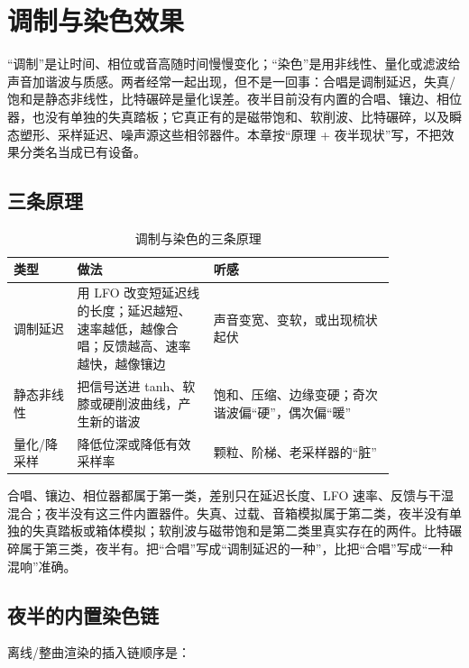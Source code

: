 \chapter{调制与染色效果}
\label{chap:modulation-coloration}


“调制”是让时间、相位或音高随时间慢慢变化；“染色”是用非线性、量化或滤波给声音加谐波与质感。两者经常一起出现，但不是一回事：合唱是调制延迟，失真/饱和是静态非线性，比特碾碎是量化误差。夜半目前没有内置的合唱、镶边、相位器，也没有单独的失真踏板；它真正有的是磁带饱和、软削波、比特碾碎，以及瞬态塑形、采样延迟、噪声源这些相邻器件。本章按“原理 + 夜半现状”写，不把效果分类名当成已有设备。

\section{三条原理}

\begin{table}[htbp]
\centering
\small
\begin{tabular}{@{}p{0.14\linewidth}p{0.30\linewidth}p{0.40\linewidth}@{}}
\hline
类型 & 做法 & 听感 \\
\hline
调制延迟 & 用 LFO 改变短延迟线的长度；延迟越短、速率越低，越像合唱；反馈越高、速率越快，越像镶边 & 声音变宽、变软，或出现梳状起伏 \\
静态非线性 & 把信号送进 tanh、软膝或硬削波曲线，产生新的谐波 & 饱和、压缩、边缘变硬；奇次谐波偏“硬”，偶次偏“暖” \\
量化/降采样 & 降低位深或降低有效采样率 & 颗粒、阶梯、老采样器的“脏” \\
\hline
\end{tabular}
\caption{调制与染色的三条原理}
\label{tab:mod-coloration-principles}
\end{table}

合唱、镶边、相位器都属于第一类，差别只在延迟长度、LFO 速率、反馈与干湿混合；夜半没有这三件内置器件。失真、过载、音箱模拟属于第二类，夜半没有单独的失真踏板或箱体模拟；软削波与磁带饱和是第二类里真实存在的两件。比特碾碎属于第三类，夜半有。把“合唱”写成“调制延迟的一种”，比把“合唱”写成“一种混响”准确。

\section{夜半的内置染色链}

离线/整曲渲染的插入链顺序是：

